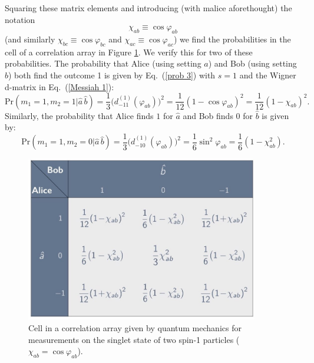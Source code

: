 Squaring these matrix elements and introducing (with malice aforethought) the notation
\begin{equation}
\chi_{ab} \equiv \cos\varphi_{ab}\label{spin-s cosines}
\end{equation}
(and similarly $\chi_{bc}\equiv \cos\varphi_{bc}$ and $\chi_{ac}\equiv \cos\varphi_{ac}$) we find the probabilities in the cell of a correlation array in Figure \ref{CA-cell-spin1-chi}. 
We verify this for two of these probabilities. The probability that Alice (using setting $\hat{a}$) and Bob  (using setting $\hat{b}$) both find the outcome 1 is given by Eq.\ (\ref{prob 3}) with $s=1$ and the Wigner d-matrix in Eq.\ (\ref{Messiah 1}):
\begin{equation}
\mathrm{Pr}(m_1 = 1, m_2 = 1| \hat{a}\, \hat{b} ) = \frac13 \Big( d^{(1)}_{-11}( \varphi_{ab}) \Big)^{\!2} 
= \frac{1}{12} (1-\cos{\varphi_{ab}})^2 = \frac{1}{12} (1-\chi_{ab})^2.
\label{prob 3aa}
\end{equation}
Similarly, the probability that Alice finds $1$ for $\hat{a}$ and Bob finds $0$ for $\hat{b}$ is given by:
\begin{equation}
\mathrm{Pr}(m_1 = 1, m_2 = 0| \hat{a}\, \hat{b} ) = \frac13 \Big( d^{(1)}_{-10}( \varphi_{ab}) \Big)^{\!2} = \frac16 \sin^{2}{\!\varphi_{ab}} = \frac16 (1-\chi_{ab}^2).
\label{prob 3a}
\end{equation}

\begin{figure}[ht]
 \centering
   \includegraphics[width=4in]{CA-cell-spin1-chi.jpeg} 
   \caption{Cell in a correlation array given by quantum mechanics for measurements on the singlet state of two spin-1 particles ($\chi_{ab} = \cos{\varphi_{ab}}$).}
    \label{CA-cell-spin1-chi}
\end{figure}


